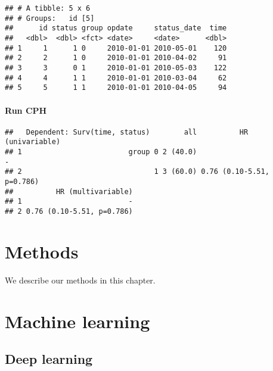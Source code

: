 \documentclass[]{book}
\newenvironment{Shaded}{\begin{snugshade}}{\end{snugshade}}
\newcommand{\KeywordTok}[1]{\textcolor[rgb]{0.13,0.29,0.53}{\textbf{#1}}}
\newcommand{\NormalTok}[1]{#1}
\newcommand{\OperatorTok}[1]{\textcolor[rgb]{0.81,0.36,0.00}{\textbf{#1}}}
\newcommand{\StringTok}[1]{\textcolor[rgb]{0.31,0.60,0.02}{#1}}
\theoremstyle{definition}
\theoremstyle{definition}
\theoremstyle{definition}
\theoremstyle{remark}
\begin{document}
\begin{verbatim}
## # A tibble: 5 x 6
## # Groups:   id [5]
##      id status group opdate     status_date  time
##   <dbl>  <dbl> <fct> <date>     <date>      <dbl>
## 1     1      1 0     2010-01-01 2010-05-01    120
## 2     2      1 0     2010-01-01 2010-04-02     91
## 3     3      0 1     2010-01-01 2010-05-03    122
## 4     4      1 1     2010-01-01 2010-03-04     62
## 5     5      1 1     2010-01-01 2010-04-05     94
\end{verbatim}

\hypertarget{run-cph}{%
\subsubsection{Run CPH}\label{run-cph}}

\begin{Shaded}
\end{Shaded}

\begin{verbatim}
##   Dependent: Surv(time, status)        all          HR (univariable)
## 1                         group 0 2 (40.0)                         -
## 2                               1 3 (60.0) 0.76 (0.10-5.51, p=0.786)
##          HR (multivariable)
## 1                         -
## 2 0.76 (0.10-5.51, p=0.786)
\end{verbatim}

\hypertarget{methods}{%
\chapter{Methods}\label{methods}}

We describe our methods in this chapter.

\hypertarget{machine-learning}{%
\chapter{Machine learning}\label{machine-learning}}

\hypertarget{deep-learning}{%
\section{Deep learning}\label{deep-learning}}
\end{document}
